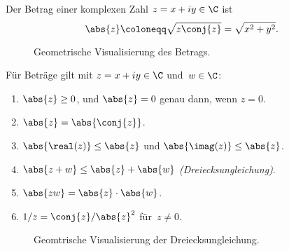 \documentclass[a4paper]{article}
\begin{document}
\begin{definition}[Betrag]
    Der Betrag einer komplexen Zahl $z = x+iy \in \C$ ist
    \begin{equation*}
        \abs{z} \coloneqq \sqrt{z\conj{z}} = \sqrt{x^2+y^2}.
    \end{equation*}
\end{definition}

\begin{figure}
    \caption{Geometrische Visualisierung des Betrags.}
\end{figure}

\begin{lemma}\label{lem:complex:absolute}
    Für Beträge gilt mit $z = x+iy \in \C$ und~$w \in \C$:
    \begin{enumerate}
        \item $\abs{z} \geq 0$, und $\abs{z} = 0$ genau dann, wenn $z = 0$.
        \item $\abs{z} = \abs{\conj{z}}$.
        \item $\abs{\real(z)} \leq \abs{z}$ und $\abs{\imag(z)} \leq \abs{z}$.
        \item $\abs{z+w} \leq \abs{z}+\abs{w}$ \emph{(Dreiecksungleichung)}.
        \item $\abs{zw} = \abs{z}\cdot\abs{w}$.
        \item $1/z = \conj{z}/\abs{z}^2$ für~$z \neq 0$.
    \end{enumerate}
\end{lemma}

\begin{figure}
    \caption{Geomtrische Visualisierung der Dreiecksungleichung.}
\end{figure}
\end{document}
